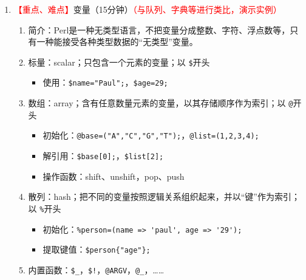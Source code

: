 \documentclass{TIJMUjiaoanLL}
\begin{document}
\begin{enumerate}
\begin{enumerate}
\begin{itemize}
	  \item 书籍（编程语言角度）：\textit{Learning Perl} $\Rightarrow$ \textit{Intermediate Perl} $\Rightarrow$ \textit{Mastering Perl} $\Rightarrow$ \textit{Programming Perl} $\Rightarrow$ \textit{Advanced Perl Programming}
	\end{itemize}
      \item \textcolor{red}{【重点】}基本语法\textcolor{red}{（演示实例操作）}
\vspace*{-10pt}
	\begin{multicols}{2}
\begin{verbatim}
#!/usr/bin/perl
use strict;
use warnings;
print "Hello World!\n";
\end{verbatim}
\begin{enumerate}
  \item 编写脚本，vim hello.pl
  \item 修改权限，chmod 755 hello.pl
  \item 运行脚本，perl hello.pl，./hello.pl
\end{enumerate}
\end{multicols}
\vspace*{-10pt}
      \item 其他：文本编辑器（Vim，插件：perl-support.vim）；检查语法（perl -c script.pl）；格式化代码（perltidy）
    \end{enumerate}
  \item \textcolor{red}{【重点、难点】}变量（15分钟）\textcolor{red}{（与队列、字典等进行类比，演示实例）}
    \begin{enumerate}
      \item 简介：Perl是一种无类型语言，不把变量分成整数、字符、浮点数等，只有一种能接受各种类型数据的“无类型”变量。
      \item 标量：scalar；只包含一个元素的变量；以 \verb|$|开头
	\begin{itemize}
	  \item 使用：\verb|$name="Paul";|，\verb|$age=29;|
	\end{itemize}
      \item 数组：array；含有任意数量元素的变量，以其存储顺序作为索引；以 \verb|@|开头
	\begin{itemize}
	  \item 初始化：\verb|@base=("A","C","G","T");|，\verb|@list=(1,2,3,4);|
	  \item 解引用：\verb|$base[0];|，\verb|$list[2];|
	  \item 操作函数：shift、unshift，pop、push
	\end{itemize}
      \item 散列：hash；把不同的变量按照逻辑关系组织起来，并以“键”作为索引；以 \verb|%|开头
	\begin{itemize}
	  \item 初始化：\verb|%person=(name => 'paul', age => '29');|
	  \item 提取键值：\verb|$person{"age"};|
	\end{itemize}
      \item 内置函数：\verb|$_|，\verb|$!|，\verb|@ARGV|，\verb|@_|，……
    \end{enumerate}


\end{enumerate}
\end{document}
